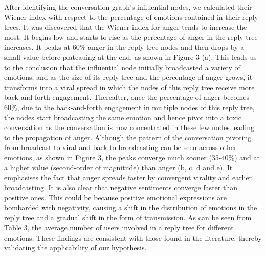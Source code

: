 \documentclass[acmtog]{acmart}
\begin{document}
After identifying the conversation graph's influential nodes, we calculated their Wiener index with respect to the percentage of emotions contained in their reply trees. It was discovered that the Wiener index for anger tends to increase the most. It begins low and starts to rise as the percentage of anger in the reply tree increases. It peaks at 60\% anger in the reply tree nodes and then drops by a small value before plateauing at the end, as shown in Figure 3 (a). This leads us to the conclusion that the influential node initially broadcasted a variety of emotions, and as the size of its reply tree and the percentage of anger grows, it transforms into a viral spread in which the nodes of this reply tree receive more back-and-forth engagement. Thereafter, once the percentage of anger becomes 60\%, due to the back-and-forth engagement in multiple nodes of this reply tree, the nodes start broadcasting the same emotion and hence pivot into a toxic conversation as the conversation is now concentrated in these few nodes leading to the propagation of anger. Although the pattern of the conversation pivoting from broadcast to viral and back to broadcasting can be seen across other emotions, as shown in Figure 3, the peaks converge much sooner (35-40\%) and at a higher value (second-order of magnitude) than anger (b, c, d and e). It emphasises the fact that anger spreads faster by convergent virality and earlier broadcasting. It is also clear that negative sentiments converge faster than positive ones. This could be because positive emotional expressions are bombarded with negativity, causing a shift in the distribution of emotions in the reply tree and a gradual shift in the form of transmission. As can be seen from Table 3, the average number of users involved in a reply tree for different emotions. These findings are consistent with those found in the literature, thereby validating the applicability of our hypothesis.
\end{document}
